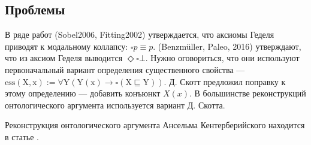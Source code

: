 \documentclass[openany]{book}
\theoremstyle{plain}
\theoremstyle{definition}
\begin{document}
\subsection{Проблемы}

В ряде работ (Sobel2006, Fitting2002) утверждается, что аксиомы Геделя приводят к модальному коллапсу: \(\square p \equiv p\). (Benzm\"{u}ller, Paleo, 2016) утверждают, что из аксиом Геделя выводится \(\Diamond \square \bot\). Нужно оговориться, что они используют первоначальный вариант определения существенного свойства --- \(\mathrm{ess(X, x) := \forall Y (Y(x) \to \square (X \sqsubseteq Y))}\). Д. Скотт предложил поправку к этому определению --- добавить конъюнкт \(X(x)\). В большинстве реконструкций онтологического аргумента используется вариант Д. Скотта.

Реконструкция онтологического аргумента Ансельма Кентерберийского находится в статье \cite{Ramharter}.
\end{document}
